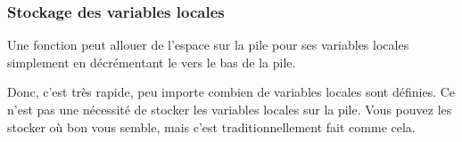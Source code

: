 ﻿\subsubsection{Stockage des variables locales}

Une fonction peut allouer de l'espace sur la pile pour ses variables locales
simplement en décrémentant le  vers le
bas de la pile.


Donc, c'est très rapide, peu importe combien de variables locales sont définies.
Ce n'est pas une nécessité de stocker les variables locales sur la pile.
Vous pouvez les stocker où bon vous semble,
mais c'est traditionnellement fait comme cela.
